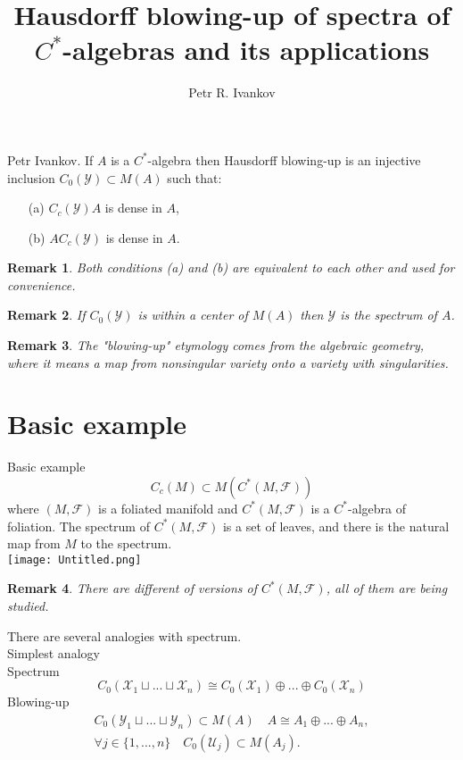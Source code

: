 \documentclass{beamer}
\title{Hausdorff blowing-up of spectra of $C^*$-algebras and its applications}
\institute
{
Algebras in analysis
}
\author{Petr R. Ivankov  }
\theoremstyle{plain}
\newtheorem{rem}{Remark}
\newcommand{\sF}{\mathcal{F}}       %
\newcommand{\sU}{\mathcal{U}}       %
\newcommand{\sX}{\mathcal{X}}       %
\newcommand{\sY}{\mathcal{Y}}       %
\newcommand{\bean}{\begin{eqnarray*}}
\newcommand{\eean}{\end{eqnarray*}}
\begin{document}
\begin{frame}
  \titlepage
\end{frame}
\begin{frame}
\begin{definition}\label{blowing_u_defn}\alert{Petr Ivankov.}
	If $A$ is a $C^*$-algebra then \alert{Hausdorff blowing-up} is an injective inclusion  $C_0\left( \sY\right) \subset M\left( A\right)$ such that:
\begin{enumerate}
	\item[(a)] $C_c\left( \sY\right)A$ is dense in $A$,
	\item [(b)]  $AC_c\left( \sY\right)$ is dense in $A$.
\end{enumerate} 
\end{definition}
\begin{rem}
Both conditions (a) and (b) are equivalent to each other and used for convenience.
\end{rem}
\begin{rem}
	If $C_0\left( \sY\right)$ is within a center of $M\left( A\right)$ then $\sY$ is the spectrum of $A$.
\end{rem}
\begin{rem}
	The "blowing-up" etymology comes from the algebraic geometry, where it means a map from nonsingular variety  onto a variety with singularities.
\end{rem}

\end{frame}
\section{Basic example}
\begin{frame}
	Basic example $$C_c\left(M \right) \subset M\left( C^*\left(M, \sF \right)\right) $$  where 
	$\left(M, \sF \right)$ is a foliated manifold and  $C^*\left(M, \sF \right)$ is a $C^*$-algebra of foliation. The spectrum of $C^*\left(M, \sF \right)$ is a set of leaves, and there is the natural map from $M$ to the spectrum.
\\
\texttt{[image: Untitled.png]}
\begin{rem}
There are different of versions of $ C^*\left(M, \sF \right)$, all of them are being studied.
\end{rem}
\end{frame}
\begin{frame}
There are several  analogies  with spectrum.\\
Simplest analogy\\
Spectrum
$$
C_0\left(\sX_1\sqcup ...\sqcup \sX_n \right) \cong C_0\left(\sX_1 \right) \oplus ...\oplus C_0\left(\sX_n \right) 
$$
Blowing-up
\bean
C_0\left( \sY_1\sqcup ...\sqcup \sY_n\right)\subset M\left( A\right)\quad   
A \cong A_1\oplus ...\oplus A_n,\\
\forall j \in \{1,...,n\}\quad C_0\left(\sU_j \right) \subset M\left(A_j \right). 
\eean

\end{frame}
\end{document}

